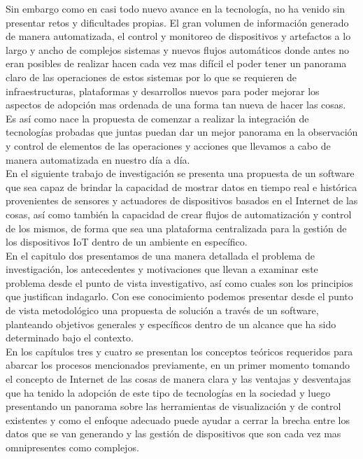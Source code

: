 Sin embargo como en casi todo nuevo avance en la tecnología, no ha venido sin presentar retos y dificultades propias. El gran volumen de información generado de manera automatizada, el control y monitoreo de dispositivos y artefactos a lo largo y ancho de complejos sistemas y nuevos flujos automáticos donde antes no eran posibles de realizar hacen cada vez mas difícil el poder tener un panorama claro de las operaciones de estos sistemas por lo que se requieren de infraestructuras, plataformas y desarrollos nuevos para poder mejorar los aspectos de adopción mas ordenada de una forma tan nueva de hacer las cosas. Es así como nace la propuesta de comenzar a realizar la integración de tecnologías probadas que juntas puedan dar un mejor panorama en la observación y control de elementos de las operaciones y acciones que llevamos a cabo de manera automatizada en nuestro día a día.\\

En el siguiente trabajo de investigación se presenta una propuesta de un software que sea capaz de brindar la capacidad de mostrar datos en tiempo real e histórica provenientes de sensores y actuadores de dispositivos basados en el Internet de las cosas, así como también la capacidad de crear flujos de automatización y control de los mismos, de forma que sea una plataforma centralizada para la gestión de los dispositivos IoT dentro de un ambiente en específico.\\

En el capitulo dos presentamos de una manera detallada el problema de investigación, los antecedentes y motivaciones que llevan a examinar este problema desde el punto de vista investigativo, así como cuales son los principios que justifican indagarlo. Con ese conocimiento podemos presentar desde el punto de vista metodológico una propuesta de solución a través de un software, planteando objetivos generales y específicos dentro de un alcance que ha sido determinado bajo el contexto.\\

En los capítulos tres y cuatro se presentan los conceptos teóricos requeridos para abarcar los procesos mencionados previamente, en un primer momento tomando el concepto de Internet de las cosas de manera clara y las ventajas y desventajas que ha tenido la adopción de este tipo de tecnologías en la sociedad y luego presentando un panorama sobre las herramientas de visualización y de control existentes y como el enfoque adecuado puede ayudar a cerrar la brecha entre los datos que se van generando y las gestión de dispositivos que son cada vez mas omnipresentes como complejos.\\

